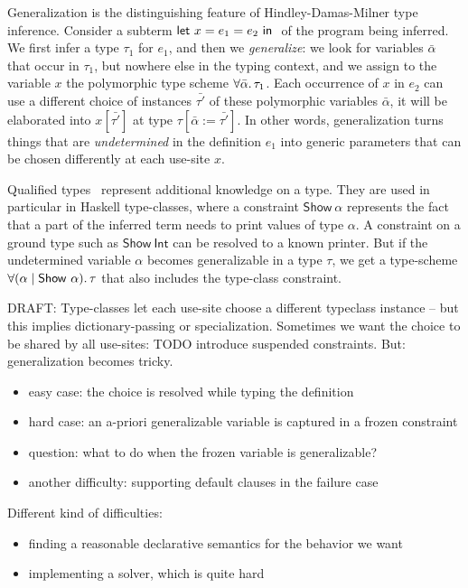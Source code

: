 \documentclass[acmsmall,screen,nonacm]{acmart}
\begin{document}
\begin{version}{}


Generalization is the distinguishing feature of Hindley-Damas-Milner type
inference. Consider a subterm $\cletin{x = e_1}{e_2}$ of the program being
inferred. We first infer a type $\tau_1$ for $e_1$, and then we
\emph{generalize}: we look for variables $\bar{\alpha}$ that occur in
$\tau_1$, but nowhere else in the typing context, and we assign to the
variable $x$ the polymorphic type scheme $\forall {\bar{\alpha}}.\,{\tau_1}$. Each
occurrence of $x$ in $e_2$ can use a different choice of instances
$\bar{\tau'}$ of these polymorphic variables $\bar{\alpha}$, it will be
elaborated into $x [\bar{\tau'}]$ at type $\tau[\bar{\alpha} :=
\bar{\tau'}]$. In other words, generalization turns things that are
\emph{undetermined} in the definition $e_1$ into generic parameters that can
be chosen differently at each use-site $x$.

Qualified types~\citep*{TODO} represent additional knowledge on a type. They
are used in particular in Haskell type-classes, where a constraint
$\mathsf{Show}~\alpha$ represents the fact that a part of the inferred term
needs to print values of type $\alpha$. A constraint on a ground type such
as $\mathsf{Show}~\mathsf{Int}$ can be resolved to a known printer. But if
the undetermined variable $\alpha$ becomes generalizable in a type $\tau$,
we get a type-scheme $\forall {(\alpha \mid \mathsf{Show}~\alpha)}.\,{\tau}$ that
also includes the type-class constraint.

DRAFT: Type-classes let each use-site choose a different typeclass instance
-- but this implies dictionary-passing or specialization. Sometimes we want
the choice to be shared by all use-sites: TODO introduce suspended
constraints. But: generalization becomes tricky.
\begin{itemize}
\item easy case: the choice is resolved while typing the definition
\item hard case: an a-priori generalizable variable is captured in a frozen
   constraint 
\item question: what to do when the frozen variable is generalizable?
\item another difficulty: supporting default clauses in the failure case
\end{itemize}

Different kind of difficulties:
\begin{itemize}
\item finding a reasonable declarative semantics for the behavior we want
\item implementing a solver, which is quite hard
\end{itemize}
\end{version}
\end{document}
